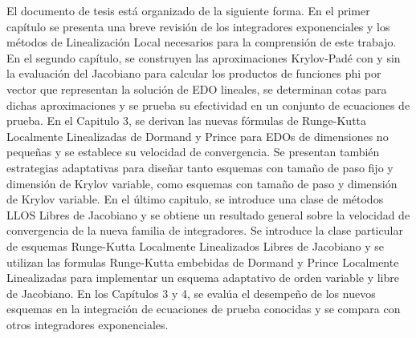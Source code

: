 
El documento de tesis está organizado de la siguiente forma. En el primer capítulo se presenta una breve revisión de los integradores exponenciales y los métodos de Linealización Local necesarios para la comprensión de este trabajo. En el segundo capítulo, se construyen las aproximaciones Krylov-Padé con y sin la evaluación del Jacobiano para calcular los productos de funciones phi por vector que representan la solución de EDO lineales, se determinan cotas para dichas aproximaciones y se prueba su efectividad en un conjunto de ecuaciones de prueba. En el Capitulo 3, se derivan las nuevas fórmulas de Runge-Kutta Localmente Linealizadas de Dormand y Prince para EDOs de dimensiones no pequeñas y se establece su velocidad de convergencia. Se presentan también estrategias adaptativas para diseñar tanto esquemas con tamaño de paso fijo y dimensión de Krylov variable, como esquemas con tamaño de paso y dimensión de Krylov variable. En el último capitulo, se introduce una clase de métodos LLOS Libres de Jacobiano y se obtiene un resultado general sobre la velocidad de convergencia de la nueva familia de integradores. Se introduce la clase particular de esquemas Runge-Kutta Localmente Linealizados Libres de Jacobiano y se utilizan las formulas Runge-Kutta embebidas de Dormand y Prince Localmente Linealizadas para implementar un esquema adaptativo de orden variable y libre de Jacobiano.
En los Capítulos 3 y 4, se evalúa el desempeño de los nuevos esquemas en la integración de ecuaciones de prueba conocidas y se compara con otros integradores exponenciales.

